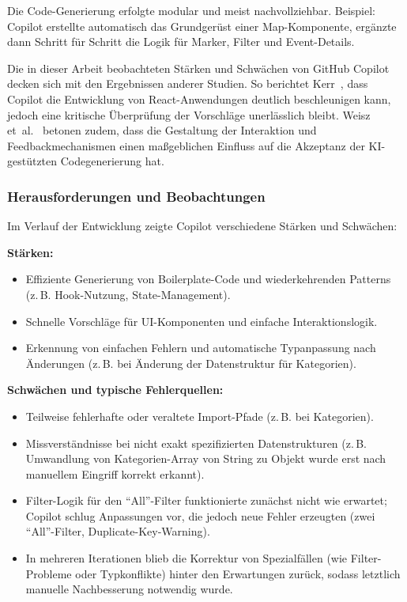 Die Code-Generierung erfolgte modular und meist nachvollziehbar. Beispiel:
Copilot erstellte automatisch das Grundgerüst einer Map-Komponente, ergänzte
dann Schritt für Schritt die Logik für Marker, Filter und Event-Details.

Die in dieser Arbeit beobachteten Stärken und Schwächen von GitHub Copilot
decken sich mit den Ergebnissen anderer Studien. So berichtet
Kerr~\cite{kerr_github_nodate}, dass Copilot die Entwicklung von
React-Anwendungen deutlich beschleunigen kann, jedoch eine kritische
Überprüfung der Vorschläge unerlässlich bleibt. Weisz
et~al.~\cite{weisz_design_2024} betonen zudem, dass die Gestaltung der
Interaktion und Feedbackmechanismen einen maßgeblichen Einfluss auf die
Akzeptanz der KI-gestützten Codegenerierung hat.

\subsubsection{Herausforderungen und Beobachtungen}
Im Verlauf der Entwicklung zeigte Copilot verschiedene Stärken und Schwächen:

\textbf{Stärken:}
\begin{itemize}
      \item Effiziente Generierung von Boilerplate-Code und wiederkehrenden Patterns
            (z.\,B. Hook-Nutzung, State-Management).
      \item Schnelle Vorschläge für UI-Komponenten und einfache Interaktionslogik.
      \item Erkennung von einfachen Fehlern und automatische Typanpassung nach Änderungen
            (z.\,B. bei Änderung der Datenstruktur für Kategorien).
\end{itemize}

\textbf{Schwächen und typische Fehlerquellen:}
\begin{itemize}
      \item Teilweise fehlerhafte oder veraltete Import-Pfade (z.\,B. bei Kategorien).
      \item Missverständnisse bei nicht exakt spezifizierten Datenstrukturen (z.\,B.
            Umwandlung von Kategorien-Array von String zu Objekt wurde erst nach manuellem
            Eingriff korrekt erkannt).
      \item Filter-Logik für den ``All''-Filter funktionierte zunächst nicht wie erwartet;
            Copilot schlug Anpassungen vor, die jedoch neue Fehler erzeugten (zwei
            ``All''-Filter, Duplicate-Key-Warning).
      \item In mehreren Iterationen blieb die Korrektur von Spezialfällen (wie
            Filter-Probleme oder Typkonflikte) hinter den Erwartungen zurück, sodass
            letztlich manuelle Nachbesserung notwendig wurde.
\end{itemize}

